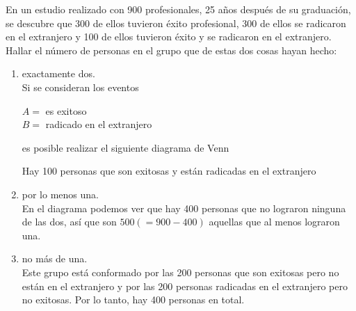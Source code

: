 \item En un estudio realizado con 900 profesionales, 25 años después de su graduación, se descubre que 300 de ellos tuvieron éxito profesional, 300 de ellos se radicaron en el extranjero y 100 de ellos tuvieron éxito y se radicaron en el extranjero. Hallar el número de personas en el grupo que de estas dos cosas hayan hecho:
    \begin{enumerate}
        \item exactamente dos.\e\\
            Si se consideran los eventos
            \begin{center}
                $A=$ es exitoso\\
                $B=$ radicado en el extranjero 
            \end{center}
            es posible realizar el siguiente diagrama de Venn
            \begin{center}
            \end{center}
            Hay 100 personas que son exitosas y están radicadas en el extranjero
        \item por lo menos una.\e\\
            En el diagrama podemos ver que hay 400 personas que no lograron ninguna de las dos, así que son $500(=900-400)$ aquellas que al menos lograron una.\e
        \item no más de una.\e\\
            Este grupo está conformado por las 200 personas que son exitosas pero no están en el extranjero y por las 200 personas radicadas en el extranjero pero no exitosas. Por lo tanto, hay 400 personas en total.
    \end{enumerate}